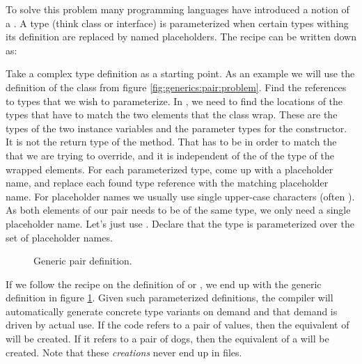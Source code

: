 To solve this problem many programming languages have introduced a notion of a . A type (think class or interface) is parameterized when certain types withing its definition are replaced by named placeholders. The recipe can be written down as:
\begin{enumerate}
   Take a complex type definition as a starting point. As an example we will use the definition of the  class from figure \ref{fig:generics:pair:problem}.
   Find the references to types that we wish to parameterize. In , we need to find the locations of the types that have to match the two elements that the class wrap. These are the types of the two instance variables and the parameter types for the constructor. It is not the return type of the  method. That has to be  in order to match the  that we are trying to override, and it is independent of the of the type of the wrapped elements.
   For each parameterized type, come up with a placeholder name, and replace each found type reference with the matching placeholder name. For placeholder names we usually use single upper-case characters (often ). As both elements of our pair needs to be of the same type, we only need a single placeholder name. Let's just use .
   Declare that the type is parameterized over the set of placeholder names.
\end{enumerate}

\begin{figure}[tbp]
  
  \caption{Generic pair definition.}
  \label{fig:generics:pair:solution}
\end{figure}

If we follow the recipe on the definition of  or , we end up with the generic  definition in figure \ref{fig:generics:pair:solution}. Given such parameterized definitions, the compiler will automatically generate concrete type variants on demand and that demand is driven by actual use. If the code refers to a pair of  values, then the equivalent of  will be created. If it refers to a pair of dogs, then the equivalent of a  will be created. Note that these \textsl{creations} never end up in files.


